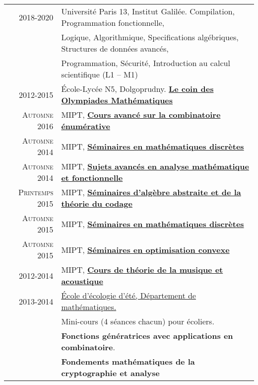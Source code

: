 \documentclass[a4paper,10pt]{article} %
\begin{document}
\begin{tabular}{rl}
2018-2020 & Université Paris 13, Institut Galilée.
Compilation,
Programmation fonctionnelle,
\\
&
Logique,
Algorithmique,
Specifications algébriques,
Structures de données avancés,
\\
&
Programmation,
Sécurité,
Introduction au calcul scientifique (L1 -- M1)
\\
2012-2015 & École-Lycée N5, Dolgoprudny.
\href{https://drive.google.com/folderview?id=0B733JIZxEnkNNXFZcEp5QWlTY0k&usp=sharing}
{\textbf{Le coin des Olympiades Mathématiques}} \\

\textsc{Automne} 2016 & MIPT,
\href{https://github.com/Electric-tric/mipt-teach-enum-comb}
{\textbf{Cours avancé sur la combinatoire énumérative}} \\
\textsc{Automne} 2014 & MIPT,
\href{https://drive.google.com/folderview?id=0B733JIZxEnkNVFJ1azljVmtpTDA&usp=sharing}
{\textbf{Séminaires en mathématiques discrètes}} \\
\textsc{Automne 2014} & MIPT,
\href{https://drive.google.com/folderview?id=0B733JIZxEnkNdnJ4S1JWTlJRQjA&usp=sharing}
{\textbf{Sujets avancés en analyse mathématique et fonctionnelle}} \\
\textsc{Printemps} 2015 & MIPT,
\href{https://drive.google.com/folderview?id=0B733JIZxEnkNM1NLVE96dXJGT1k&usp=sharing}
{\textbf{Séminaires d'algèbre abstraite et de la théorie du codage}} \\
\textsc{Automne} 2015 & MIPT,
\href{https://drive.google.com/folderview?id=0B733JIZxEnkNRFhQdW5Nak5FRUU&usp=sharing}
{\textbf{Séminaires en mathématiques discrètes}} \\
\textsc{Automne} 2015 & MIPT,
\href{https://drive.google.com/folderview?id=0B733JIZxEnkNWVVDVjdYVk1tclE&usp=sharing}
{\textbf{Séminaires en optimisation convexe}} \\
2012-2014 & MIPT,
\href{http://www.youtube.com/channel/UC_D60LCndYzZWxr_ZgRhQ0Q}
{\textbf{Cours de théorie de la musique et acoustique}}
\\
2013-2014 &
\href{https://sites.google.com/site/maolesh/study/kursy-procitannye-na-les-2013}{École
d'écologie d'été, Département de mathématiques.}\\
& Mini-cours (4 séances  chacun) pour écoliers. \\
& \textbf{Fonctions génératrices avec applications en combinatoire}. \\
& \textbf{Fondements mathématiques de la cryptographie et analyse}

\end{tabular}
\end{document}
